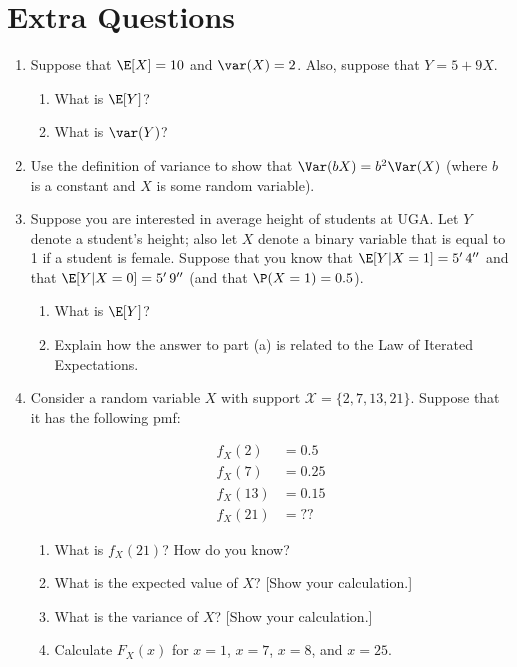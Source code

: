 \documentclass[
  letterpaper,
  DIV=11,
  numbers=noendperiod]{scrreprt}
\begin{document}
\section{Extra Questions}\label{extra-questions}

\begin{enumerate}
\def\labelenumi{\arabic{enumi}.}
\item
  Suppose that \(\E[X] = 10\) and \(\var(X) = 2\). Also, suppose that
  \(Y=5 + 9 X\).

  \begin{enumerate}
  \def\labelenumii{\alph{enumii})}
  \item
    What is \(\E[Y]\)?
  \item
    What is \(\var(Y)\)?
  \end{enumerate}
\item
  Use the definition of variance to show that \(\Var(bX) = b^2 \Var(X)\)
  (where \(b\) is a constant and \(X\) is some random variable).
\item
  Suppose you are interested in average height of students at UGA. Let
  \(Y\) denote a student's height; also let \(X\) denote a binary
  variable that is equal to 1 if a student is female. Suppose that you
  know that \(\E[Y|X=1] = 5' \,4''\) and that \(\E[Y|X=0] = 5' \,9''\)
  (and that \(\P(X=1) = 0.5\)).

  \begin{enumerate}
  \def\labelenumii{\alph{enumii})}
  \item
    What is \(\E[Y]\)?
  \item
    Explain how the answer to part (a) is related to the Law of Iterated
    Expectations.
  \end{enumerate}
\item
  Consider a random variable \(X\) with support
  \(\mathcal{X} = \{2,7,13,21\}\). Suppose that it has the following
  pmf:

  \[
      \begin{aligned}
       f_X(2) &= 0.5 \\
       f_X(7) &= 0.25 \\
       f_X(13) &= 0.15 \\
       f_X(21) &= ??
     \end{aligned}
   \]

  \begin{enumerate}
  \def\labelenumii{\alph{enumii})}
  \item
    What is \(f_X(21)\)? How do you know?
  \item
    What is the expected value of \(X\)? {[}Show your calculation.{]}
  \item
    What is the variance of \(X\)? {[}Show your calculation.{]}
  \item
    Calculate \(F_X(x)\) for \(x=1\), \(x=7\), \(x=8\), and \(x=25\).
  \end{enumerate}
\end{enumerate}
\end{document}
